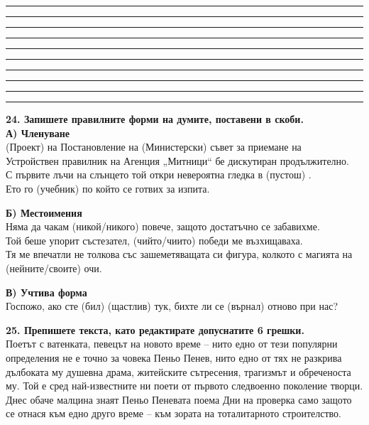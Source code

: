 \documentclass[12pt,a4paper]{article}
\begin{document}
\vspace{0.3cm}
\noindent\rule{\linewidth}{0.4pt}
\noindent\rule{\linewidth}{0.4pt}
\noindent\rule{\linewidth}{0.4pt}
\noindent\rule{\linewidth}{0.4pt}
\noindent\rule{\linewidth}{0.4pt}
\noindent\rule{\linewidth}{0.4pt}
\noindent\rule{\linewidth}{0.4pt}
\noindent\rule{\linewidth}{0.4pt}
\noindent\rule{\linewidth}{0.4pt}
\noindent\rule{\linewidth}{0.4pt}

\vspace{0.6cm}

\noindent
\textbf{24. Запишете правилните форми на думите, поставени в скоби.} \\
\textbf{А) Членуване} \\
(Проект) \dotfill на Постановление на (Министерски) \dotfill съвет за приемане на \\
Устройствен правилник на Агенция „Митници“ бе дискутиран продължително. \\
С първите лъчи на слънцето той откри невероятна гледка в (пустош) \dotfill. \\
Ето го (учебник) \dotfill по който се готвих за изпита.

\vspace{0.4cm}

\noindent
\textbf{Б) Местоимения} \\
Няма да чакам (никой/никого) \dotfill повече, защото достатъчно се забавихме. \\
Той беше упорит състезател, (чийто/чиито) \dotfill победи ме възхищаваха. \\
Тя ме впечатли не толкова със зашеметяващата си фигура, колкото с магията на (нейните/своите) \dotfill очи.

\vspace{0.4cm}

\noindent
\textbf{В) Учтива форма} \\
Госпожо, ако сте (бил) \dotfill (щастлив) \dotfill тук, бихте ли се (върнал) \dotfill отново при нас?

\vspace{0.6cm}

\noindent
\textbf{25. Препишете текста, като редактирате допуснатите 6 грешки.} \\
Поетът с ватенката, певецът на новото време – нито едно от тези популярни определения не е точно за човека
Пеньо Пенев, нито едно от тях не разкрива дълбоката му душевна драма, житейските сътресения, трагизмът и обреченоста му. Той е сред най-известните ни поети от първото следвоенно поколение творци. Днес обаче малцина знаят
Пеньо Пеневата поема Дни на проверка само защото се отнася към едно друго време – към зората на тоталитарното
строителство.
\end{document}
